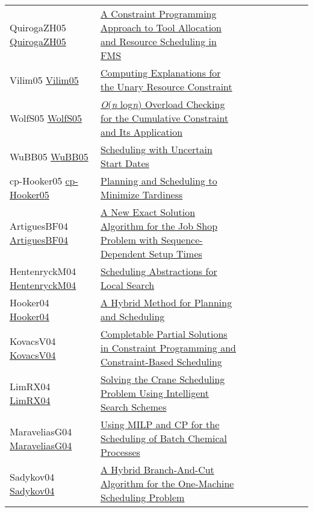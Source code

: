 {\begin{longtable}{p{3cm}p{7cm}lllllll}
QuirogaZH05 \href{https://doi.org/10.1109/ROBOT.2005.1570686}{QuirogaZH05} &  \href{papers/QuirogaZH05.pdf}{A Constraint Programming Approach to Tool Allocation and Resource Scheduling in {FMS}} &  &  &  &  &  &  & \\
Vilim05 \href{https://doi.org/10.1007/11493853\_29}{Vilim05} &  \href{papers/Vilim05.pdf}{Computing Explanations for the Unary Resource Constraint} &  &  &  &  &  &  & \\
WolfS05 \href{https://doi.org/10.1007/11963578\_8}{WolfS05} &  \href{papers/WolfS05.pdf}{\emph{O}(\emph{n} log\emph{n}) Overload Checking for the Cumulative Constraint and Its Application} &  &  &  &  &  &  & \\
WuBB05 \href{https://doi.org/10.1007/11564751\_110}{WuBB05} &  \href{papers/WuBB05.pdf}{Scheduling with Uncertain Start Dates} &  &  &  &  &  &  & \\
cp-Hooker05 \href{https://doi.org/10.1007/11564751\_25}{cp-Hooker05} &  \href{papers/cp-Hooker05.pdf}{Planning and Scheduling to Minimize Tardiness} &  &  &  &  &  &  & \\
ArtiguesBF04 \href{https://doi.org/10.1007/978-3-540-24664-0\_3}{ArtiguesBF04} &  \href{papers/ArtiguesBF04.pdf}{A New Exact Solution Algorithm for the Job Shop Problem with Sequence-Dependent Setup Times} &  &  &  &  &  &  & \\
HentenryckM04 \href{https://doi.org/10.1007/978-3-540-24664-0\_22}{HentenryckM04} &  \href{papers/HentenryckM04.pdf}{Scheduling Abstractions for Local Search} &  &  &  &  &  &  & \\
Hooker04 \href{https://doi.org/10.1007/978-3-540-30201-8\_24}{Hooker04} &  \href{papers/Hooker04.pdf}{A Hybrid Method for Planning and Scheduling} &  &  &  &  &  &  & \\
KovacsV04 \href{https://doi.org/10.1007/978-3-540-30201-8\_26}{KovacsV04} &  \href{papers/KovacsV04.pdf}{Completable Partial Solutions in Constraint Programming and Constraint-Based Scheduling} &  &  &  &  &  &  & \\
LimRX04 \href{https://doi.org/10.1007/978-3-540-30201-8\_59}{LimRX04} &  \href{papers/LimRX04.pdf}{Solving the Crane Scheduling Problem Using Intelligent Search Schemes} &  &  &  &  &  &  & \\
MaraveliasG04 \href{https://doi.org/10.1007/978-3-540-24664-0\_1}{MaraveliasG04} &  \href{papers/MaraveliasG04.pdf}{Using {MILP} and {CP} for the Scheduling of Batch Chemical Processes} &  &  &  &  &  &  & \\
Sadykov04 \href{https://doi.org/10.1007/978-3-540-24664-0\_31}{Sadykov04} &  \href{papers/Sadykov04.pdf}{A Hybrid Branch-And-Cut Algorithm for the One-Machine Scheduling Problem} &  &  &  &  &  &  & \\

\end{longtable}}
